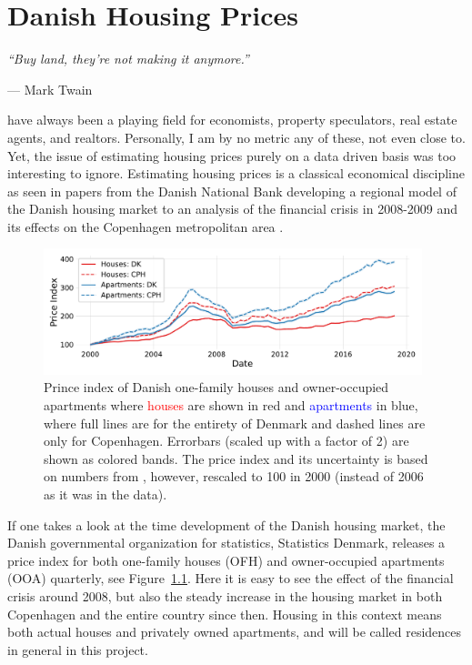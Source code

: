 
\chapter{Danish Housing Prices}
\label{ch:housing_price_analysis}
\epigraph{\textit{``Buy land, they’re not making it anymore.''}}{--- Mark Twain}
 have always been a playing field for economists, property speculators, real estate agents, and realtors. Personally, I am by no metric any of these, not even close to. Yet, the issue of estimating housing prices purely on a data driven basis was too interesting to ignore. Estimating housing prices is a classical economical discipline as seen in papers from the Danish National Bank developing a regional model of the Danish housing market \autocite{hviidWorkingPaperRegional2017} to an analysis of the financial crisis in \num{2008}-\num{2009} and its effects on the Copenhagen metropolitan area \autocite{mulalicFinancialCrisisDiverging2017}. 

\begin{figure}
  \includegraphics[width=0.98\textwidth, trim=10 15 10 10, clip]{figures/housing_price_index_dst/housingindex_wide.pdf}
  \caption[Price Index of the Danish Housing Market]
          {Prince index of Danish one-family houses and owner-occupied apartments where \textcolor{red}{houses} are shown in red and \textcolor{blue}{apartments} in blue, where full lines are for the entirety of Denmark and dashed lines are only for Copenhagen. Errorbars (scaled up with a factor of 2) are shown as colored bands. The price index and its uncertainty is based on numbers from \citet{dstPriceIndexEJ14}, however, rescaled to 100 in 2000 (instead of 2006 as it was in the data).}
  \label{fig:h:price_index}
\end{figure}

If one takes a look at the time development of the Danish housing market, the Danish governmental organization for statistics, Statistics Denmark, releases a price index \citep{dstPriceIndexEJ14} for both one-family houses (OFH) and owner-occupied apartments (OOA) quarterly, see Figure~\ref{fig:h:price_index}. Here it is easy to see the effect of the financial crisis around 2008, but also the steady increase in the housing market in both Copenhagen and the entire country since then. Housing in this context means both actual houses and privately owned apartments, and will be called residences in general in this project. 

